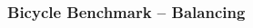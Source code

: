 \begin{frame}[label=bicycle_balance]
    \frametitle{Bicycle Benchmark -- Balancing}

    \vfill
    \begin{columns}
        \begin{column}{0.45\textwidth}
            \centering
            
        \end{column}
        \begin{column}{0.55\textwidth}
            \centering
             {
            }
        \end{column}
    \end{columns}
\end{frame}

